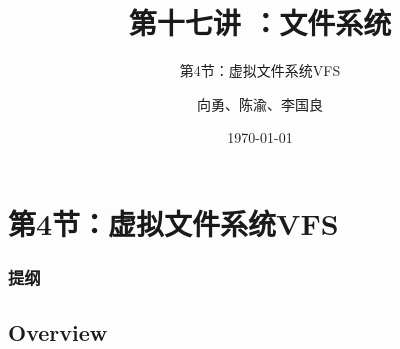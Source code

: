 


\title[第17讲]{第十七讲 ：文件系统} %
\subtitle{第4节：虚拟文件系统VFS}
\author{向勇、陈渝、李国良} %
\date{\today} %



\begin{frame}
\titlepage %
\end{frame}
\section{第4节：虚拟文件系统VFS}
% 
% 
% 
% 
% 
\begin{frame}
\frametitle{提纲} %
\tableofcontents %
\end{frame}
\subsection{Overview}


